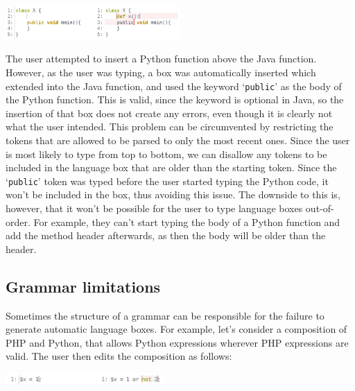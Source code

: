 \documentclass[sigplan,screen]{acmart}\settopmatter{printfolios=true,printccs=false,printacmref=false}
\newcommand{\qtt}[1]{`\texttt{#1}'\xspace}
\begin{document}
\begin{center}
\includegraphics[width=0.50\textwidth]{images/autobox_limitjavapy.png}
\end{center}

The user attempted to insert a Python function above the Java function.
However, as the user was typing, a box was automatically inserted which
extended into the Java function, and used the keyword \qtt{public} as the body
of the Python function.  This is valid, since the keyword is optional in Java,
so the insertion of that box does not create any errors, even though it is
clearly not what the user intended.
This problem can be circumvented by restricting the tokens that are allowed to
be parsed to only the most recent ones. Since the user is most likely to type
from top to bottom, we can disallow any tokens to be included in the language
box that are older than the starting token. Since the \qtt{public} token was
typed before the user started typing the Python code, it won't be included in
the box, thus avoiding this issue. The downside to this is, however, that it won't be possible for
the user to type language boxes out-of-order.  For example, they can't start
typing the body of a Python function and add the method header afterwards, as
then the body will be older than the header.

\subsection{Grammar limitations}

Sometimes the structure of a grammar can be responsible for the failure to
generate automatic language boxes. For example, let's consider a composition of
PHP and Python, that allows Python expressions wherever PHP expressions are
valid. The user then edits the composition as follows:

\begin{center}
\includegraphics[width=0.45\textwidth]{images/autobox_limitphpgrammar.png}
\end{center}
\end{document}
